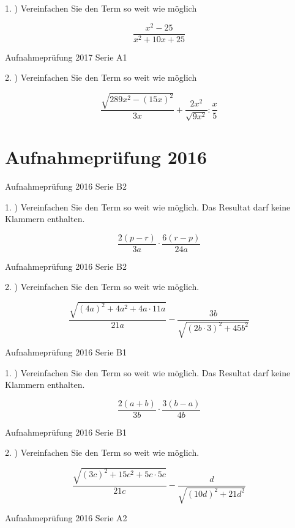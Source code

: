 {1. ) Vereinfachen Sie den Term so weit wie möglich

$$\frac{x^2-25}{x^2+10x+25}$$

Aufnahmeprüfung 2017 Serie A1

2. ) Vereinfachen Sie den Term so weit wie möglich

$$\frac{\sqrt{289x^2 - (15x)^2}}{3x} + \frac{2x^2}{\sqrt{9x^2}} : \frac{x}5$$

\section*{Aufnahmeprüfung 2016}
Aufnahmeprüfung 2016 Serie B2

1. ) Vereinfachen Sie den Term so weit wie möglich. Das Resultat darf
keine Klammern enthalten.

$$ \frac{2(p-r)}{3a} \cdot{} \frac{6(r-p)}{24a}$$


Aufnahmeprüfung 2016 Serie B2

2. ) Vereinfachen Sie den Term so weit wie möglich.

$$\frac{\sqrt{(4a)^2+4a^2+4a\cdot{}11a}}{21a} - \frac{3b}{\sqrt{(2b\cdot{}3)^2+45b^2}}$$


Aufnahmeprüfung 2016 Serie B1

1. ) Vereinfachen Sie den Term so weit wie möglich. Das Resultat darf
keine Klammern enthalten.

$$\frac{2(a+b)}{3b} \cdot{} \frac{3(b-a)}{4b}$$


Aufnahmeprüfung 2016 Serie B1

2. ) Vereinfachen Sie den Term so weit wie möglich. 

$$\frac{\sqrt{(3c)^2+15c^2+5c\cdot{}5c}}{21c} - \frac{d}{\sqrt{(10d)^2 + 21d^2}}$$


Aufnahmeprüfung 2016 Serie A2

}
